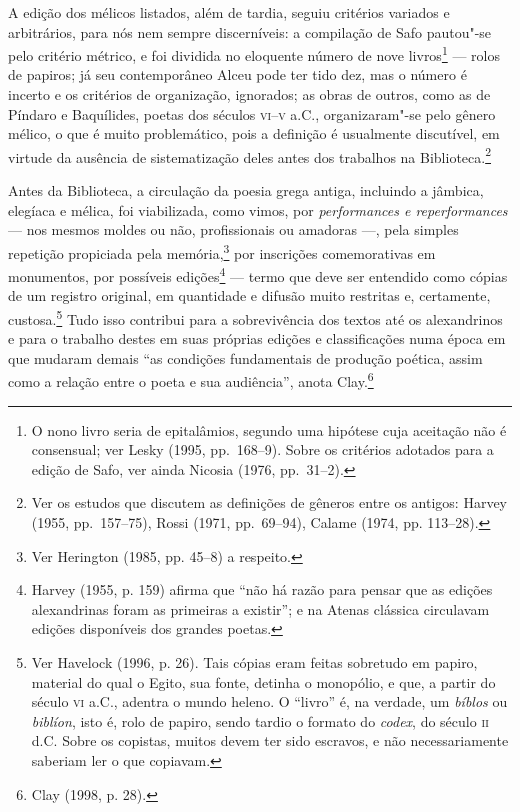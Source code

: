 A edição dos mélicos listados, além de tardia, seguiu critérios variados e
arbitrários, para nós nem sempre discerníveis: a compilação de Safo pautou"-se
pelo critério métrico, e foi dividida no eloquente número de nove
livros\footnote{ O nono livro seria de epitalâmios, segundo uma hipótese cuja
aceitação não é consensual; ver Lesky (1995, pp.~168--9). Sobre os critérios
adotados para a edição de Safo, ver ainda Nicosia (1976, pp.~31--2).}  --- rolos de papiros; já seu contemporâneo Alceu pode ter
tido dez, mas o número é incerto e os critérios de
organização, ignorados; as obras de outros, como as de Píndaro e Baquílides,
poetas dos séculos \textsc{vi}--\textsc{v} a.C., organizaram"-se pelo gênero mélico, o
que é muito problemático, pois a definição é usualmente discutível,
em virtude da ausência de sistematização deles antes dos trabalhos na
Biblioteca.\footnote{ Ver os estudos que discutem as definições de gêneros entre os
antigos: Harvey (1955, pp.~157--75), Rossi (1971, pp.~69--94), Calame (1974, pp.
113--28).}

Antes da Biblioteca, a circulação da poesia grega antiga, incluindo a jâmbica,
elegíaca e mélica, foi viabilizada, como vimos, por \textit{performances e
reperformances} --- nos mesmos moldes ou não, profissionais ou amadoras ---, pela
simples repetição propiciada pela memória,\footnote{ Ver Herington (1985, pp.
45--8) a respeito.} por inscrições comemorativas em monumentos, por possíveis
edições\footnote{ Harvey (1955, p. 159) afirma que “não há razão para pensar
que as edições alexandrinas foram as primeiras a existir”; e na Atenas clássica
circulavam edições disponíveis dos grandes poetas.} --- termo que deve ser
entendido como cópias de um registro original, em quantidade e difusão muito
restritas e, certamente, custosa.\footnote{ Ver Havelock (1996, p. 26). Tais
cópias eram feitas sobretudo em papiro, material do qual o Egito, sua fonte,
detinha o monopólio, e que, a partir do século \textsc{vi} a.C., adentra o mundo heleno.
O “livro” é, na verdade, um \textit{bíblos} ou \textit{biblíon}, isto é, rolo
de papiro, sendo tardio o formato do \textit{codex}, do século \textsc{ii} d.C. Sobre
os copistas, muitos devem ter sido escravos, e não necessariamente saberiam ler
o que copiavam.} Tudo isso contribui para a sobrevivência dos textos até os
alexandrinos e para o trabalho destes em suas próprias edições e classificações
numa época em que mudaram demais “as condições fundamentais de produção
poética, assim como a relação entre o poeta e sua audiência”, anota Clay.\footnote{ Clay (1998, p. 28).} 

